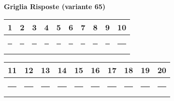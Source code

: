 \documentclass{exam}%
\newcounter{variant}%
\begin{document}
%
\normalsize%
\setcounter{variant}{65}%
\noindent \textbf{  }%
\bigskip%
\noindent\textbf{Griglia Risposte (variante 65)}%
\begin{center}
\begin{tabular}{|c|c|c|c|c|c|c|c|c|c|}
\hline
1 & 2 & 3 & 4 & 5 & 6 & 7 & 8 & 9 & 10 \\ \hline
\rule{1cm}{0pt}\rule[-0.5em]{0pt}{1.5em} & \rule{1cm}{0pt}\rule[-0.5em]{0pt}{1.5em} & \rule{1cm}{0pt}\rule[-0.5em]{0pt}{1.5em} & \rule{1cm}{0pt}\rule[-0.5em]{0pt}{1.5em} & \rule{1cm}{0pt}\rule[-0.5em]{0pt}{1.5em} & \rule{1cm}{0pt}\rule[-0.5em]{0pt}{1.5em} & \rule{1cm}{0pt}\rule[-0.5em]{0pt}{1.5em} & \rule{1cm}{0pt}\rule[-0.5em]{0pt}{1.5em} & \rule{1cm}{0pt}\rule[-0.5em]{0pt}{1.5em} & \rule{1cm}{0pt}\rule[-0.5em]{0pt}{1.5em} \\ \hline
\end{tabular}
\end{center}%
\vspace{0.3em}%
\begin{center}
\begin{tabular}{|c|c|c|c|c|c|c|c|c|c|}
\hline
11 & 12 & 13 & 14 & 15 & 16 & 17 & 18 & 19 & 20 \\ \hline
\rule{1cm}{0pt}\rule[-0.5em]{0pt}{1.5em} & \rule{1cm}{0pt}\rule[-0.5em]{0pt}{1.5em} & \rule{1cm}{0pt}\rule[-0.5em]{0pt}{1.5em} & \rule{1cm}{0pt}\rule[-0.5em]{0pt}{1.5em} & \rule{1cm}{0pt}\rule[-0.5em]{0pt}{1.5em} & \rule{1cm}{0pt}\rule[-0.5em]{0pt}{1.5em} & \rule{1cm}{0pt}\rule[-0.5em]{0pt}{1.5em} & \rule{1cm}{0pt}\rule[-0.5em]{0pt}{1.5em} & \rule{1cm}{0pt}\rule[-0.5em]{0pt}{1.5em} & \rule{1cm}{0pt}\rule[-0.5em]{0pt}{1.5em} \\ \hline
\end{tabular}
\end{center}%
\vspace{1em}%
\end{document}
